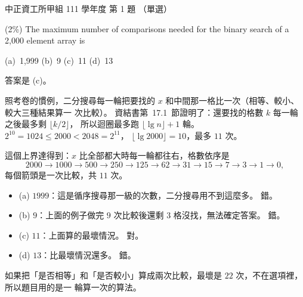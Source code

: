 \begin{pastexam}[label={px:ccu-111-swa-01}]{中正資工所甲組 111 學年度 第 1 題}
（單選）

(2\%) The maximum number of comparisons needed for the binary search of a 2,000 element
array is

(a)~1,999 \qquad (b)~9 \qquad (c)~11 \qquad (d)~13
\end{pastexam}

\begin{pastsoln}
答案是 (c)。

照考卷的慣例，二分搜尋每一輪把要找的 $x$ 和中間那一格比一次（相等、較小、較大三種結果算一
次比較）。 資結書第~17.1~節證明了：還要找的格數 $k$ 每一輪之後最多剩 $\lfloor k/2 \rfloor$，
所以迴圈最多跑 $\lfloor \lg n \rfloor + 1$ 輪。 $2^{10} = 1024 \le 2000 < 2048 = 2^{11}$，
$\lfloor \lg 2000 \rfloor = 10$，最多 $11$ 次。

這個上界達得到：$x$ 比全部都大時每一輪都往右，格數依序是
\[
2000 \to 1000 \to 500 \to 250 \to 125 \to 62 \to 31 \to 15 \to 7 \to 3 \to 1 \to 0,
\]
每個箭頭是一次比較，共 $11$ 次。

\begin{itemize}
\item (a) $1999$：這是循序搜尋那一級的次數，二分搜尋用不到這麼多。 錯。
\item (b) $9$：上面的例子做完 $9$ 次比較後還剩 $3$ 格沒找，無法確定答案。 錯。
\item (c) $11$：上面算的最壞情況。 對。
\item (d) $13$：比最壞情況還多。 錯。
\end{itemize}

如果把「是否相等」和「是否較小」算成兩次比較，最壞是 $22$ 次，不在選項裡，所以題目用的是一
輪算一次的算法。
\end{pastsoln}
